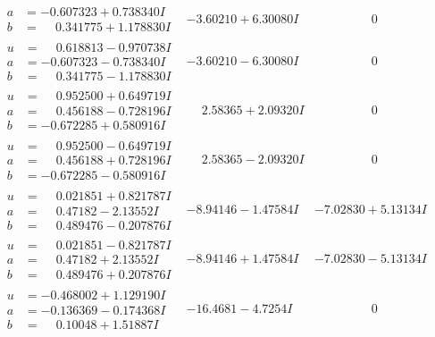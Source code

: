 \documentclass[1p]{elsarticle_modified}
\theoremstyle{definition}
\begin{document}
$$\begin{array}{c|c|c}
\begin{aligned}
a &= -0.607323 + 0.738340 I \\
b &= \phantom{-}0.341775 + 1.178830 I\end{aligned}
 & -3.60210 + 6.30080 I & \phantom{-0.000000 } 0 \\ \hline\begin{aligned}
u &= \phantom{-}0.618813 - 0.970738 I \\
a &= -0.607323 - 0.738340 I \\
b &= \phantom{-}0.341775 - 1.178830 I\end{aligned}
 & -3.60210 - 6.30080 I & \phantom{-0.000000 } 0 \\ \hline\begin{aligned}
u &= \phantom{-}0.952500 + 0.649719 I \\
a &= \phantom{-}0.456188 - 0.728196 I \\
b &= -0.672285 + 0.580916 I\end{aligned}
 & \phantom{-}2.58365 + 2.09320 I & \phantom{-0.000000 } 0 \\ \hline\begin{aligned}
u &= \phantom{-}0.952500 - 0.649719 I \\
a &= \phantom{-}0.456188 + 0.728196 I \\
b &= -0.672285 - 0.580916 I\end{aligned}
 & \phantom{-}2.58365 - 2.09320 I & \phantom{-0.000000 } 0 \\ \hline\begin{aligned}
u &= \phantom{-}0.021851 + 0.821787 I \\
a &= \phantom{-}0.47182 - 2.13552 I \\
b &= \phantom{-}0.489476 - 0.207876 I\end{aligned}
 & -8.94146 - 1.47584 I & -7.02830 + 5.13134 I \\ \hline\begin{aligned}
u &= \phantom{-}0.021851 - 0.821787 I \\
a &= \phantom{-}0.47182 + 2.13552 I \\
b &= \phantom{-}0.489476 + 0.207876 I\end{aligned}
 & -8.94146 + 1.47584 I & -7.02830 - 5.13134 I \\ \hline\begin{aligned}
u &= -0.468002 + 1.129190 I \\
a &= -0.136369 - 0.174368 I \\
b &= \phantom{-}0.10048 + 1.51887 I\end{aligned}
 & -16.4681 - 4.7254 I & \phantom{-0.000000 } 0 \\ \hline\begin{aligned}

\end{aligned}
\end{array}$$
\end{document}
